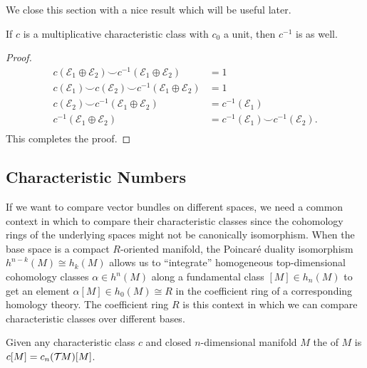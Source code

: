 We close this section with a nice result which will be useful later.
\begin{proposition}\label{prop:multiplicative-inverse-is-multiplicative}
	If $c$ is a multiplicative characteristic class with $c_0$ a unit, then $c^{-1}$ is as well.
\end{proposition}
\begin{proof}
	\begin{equation}
		\begin{aligned}
			c(\mathcal{E}_1\oplus \mathcal{E}_2)\smile c^{-1}(\mathcal{E}_1\oplus \mathcal{E}_2)    & = 1                                                  \\
			c(\mathcal{E}_1)\smile c(\mathcal{E}_2)\smile c^{-1}(\mathcal{E}_1\oplus \mathcal{E}_2) & = 1                                                  \\
			c(\mathcal{E}_2)\smile
			c^{-1}(\mathcal{E}_1\oplus \mathcal{E}_2)                                               & = c^{-1}(\mathcal{E}_1)                              \\
			c^{-1}(\mathcal{E}_1\oplus \mathcal{E}_2)                                               & = c^{-1}(\mathcal{E}_1)\smile c^{-1}(\mathcal{E}_2). \\
		\end{aligned}
	\end{equation}
	This completes the proof.
\end{proof}

\subsection{Characteristic Numbers}

If we want to compare vector bundles on different spaces, we need a common context in which to compare their characteristic classes since the cohomology rings of the underlying spaces might not be canonically isomorphism. When the base space is a compact $R$-oriented manifold, the Poincar\'e duality isomorphism $h^{n-k}(M) \cong h_k(M)$ allows us to ``integrate'' homogeneous top-dimensional cohomology classes $\alpha\in h^{n}(M)$ along a fundamental class $[M]\in h_n(M)$ to get an element $\alpha[M]\in h_0(M)\cong R$ in the coefficient ring of a corresponding homology theory. The coefficient ring $R$ is this context in which we can compare characteristic classes over different bases.

\begin{definition}\label{def:characteristic-number}
	Given any characteristic class $c$ and closed $n$-dimensional manifold $M$ the  of $M$ is $c[M] = c_n({\mathcal{T}\hspace{-0.1em}} M)[M]$.
\end{definition}

